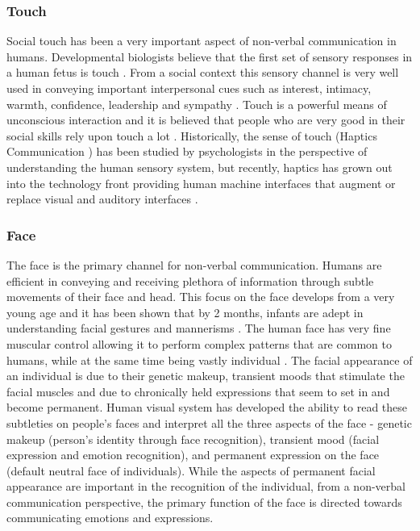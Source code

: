 \documentclass[oneside,11pt]{memoir}
\begin{document}
\subsubsection{Touch}
Social touch has been a very important aspect of non-verbal communication in humans. Developmental biologists believe that the first set of sensory responses in a human fetus is touch \cite{montagu_touching:_1986}. From a social context this sensory channel is very well used in conveying important interpersonal cues such as interest, intimacy, warmth, confidence, leadership and sympathy \cite{afifi_use_1999}. Touch is a powerful means of unconscious interaction and it is believed that people who are very good in their social skills rely upon touch a lot \cite{hertenstein_communicative_2006}. Historically, the sense of touch (Haptics Communication \cite{hertenstein_touch_2006}) has been studied by psychologists in the perspective of understanding the human sensory system, but recently, haptics has grown out into the technology front providing human machine interfaces that augment or replace visual and auditory interfaces \cite{robles-de-la-torre_principles_2008}.

\subsubsection{Face}
The face is the primary channel for non-verbal communication. Humans are efficient in conveying and receiving plethora of information through subtle movements of their face and head. This focus on the face develops from a very young age and it has been shown that by 2 months, infants are adept in understanding facial gestures and mannerisms \cite{carver_development_2002}. The human face has very fine muscular control allowing it to perform complex patterns that are common to humans, while at the same time being vastly individual \cite{rinn_neuropsychology_1984}. The facial appearance of an individual is due to their genetic makeup, transient moods that stimulate the facial muscles and due to chronically held expressions that seem to set in and become permanent. Human visual system has developed the ability to read these subtleties on people's faces and interpret all the three aspects of the face - genetic makeup (person's identity through face recognition), transient mood (facial expression and emotion recognition), and permanent expression on the face (default neutral face of individuals). While the aspects of permanent facial appearance are important in the recognition of the individual, from a non-verbal communication perspective, the primary function of the face is directed towards communicating emotions and expressions.
\end{document}
